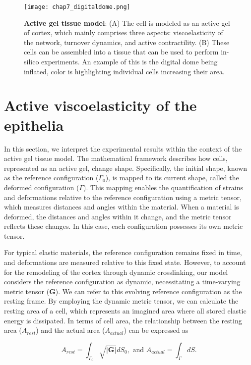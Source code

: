 \begin{figure}[]
	\centering
	\texttt{[image: chap7\_digitaldome.png]}
	\caption{\label{fig_7_2} \textbf{Active gel tissue model}: (A) The cell is modeled as an active gel of cortex, which mainly comprises three aspects: viscoelasticity of the network, turnover dynamics, and active contractility. (B) These cells can be assembled into a tissue that can be used to perform in-silico experiments. An example of this is the digital dome being inflated, color is highlighting individual cells increasing their area.}
\end{figure}

\hypertarget{active-viscoelasticity-of-the-epithelia}{%
	\section{Active viscoelasticity of the
		epithelia}\label{active-viscoelasticity-of-the-epithelia}}
	
In this section, we interpret the experimental results within the context of the active gel tissue model. The mathematical framework describes how cells, represented as an active gel, change shape. Specifically, the initial shape, known as the reference configuration (\(\Gamma_{0}\)), is mapped to its current shape, called the deformed configuration (\(\Gamma\)). This mapping enables the quantification of strains and deformations relative to the reference configuration using a metric tensor, which measures distances and angles within the material. When a material is deformed, the distances and angles within it change, and the metric tensor reflects these changes. In this case, each configuration possesses its own metric tensor.

For typical elastic materials, the reference configuration remains fixed in time, and deformations are measured relative to this fixed state. However, to account for the remodeling of the cortex through dynamic crosslinking, our model considers the reference configuration as dynamic, necessitating a time-varying metric tensor  (\(\mathbf{G}\)). We can refer to this evolving reference configuration as the resting frame. By employing the dynamic metric tensor, we can calculate the resting area of a cell, which represents an imagined area where all stored elastic energy is dissipated. In terms of cell area, the relationship between the resting area (\(A_{rest}\)) and the actual area (\(A_{actual}\)) can be expressed as

\begin{equation}
	A_{rest} = \int_{\Gamma_0} \sqrt{|\mathbf{G}|}dS_0, \text{ and } A_{actual} = \int_{\Gamma}dS.
\end{equation}

